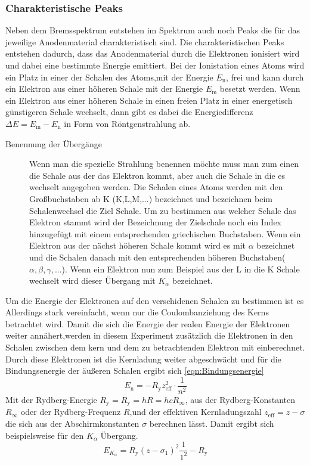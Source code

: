 \subsubsection{Charakteristische Peaks}
Neben dem Bremsspektrum entstehen im Spektrum auch noch Peaks die für das jeweilige Anodenmaterial charakteristisch sind.
Die charakteristischen Peaks entstehen dadurch, dass das Anodenmaterial durch die Elektronen ionisiert wird und dabei eine bestimmte Energie emittiert.
Bei der Ionistation eines Atoms wird ein Platz in einer der Schalen des Atoms,mit der Energie $E_{\text{n}}$, frei und kann durch ein Elektron aus einer höheren Schale mit der Energie $E_{\text{m}}$ besetzt werden.
Wenn ein Elektron aus einer höheren Schale in einen freien Platz in einer energetisch günstigeren Schale wechselt, dann gibt es dabei die Energiedifferenz $\Delta E = E_{\text{m}} -E_{\text{n}}$ in Form von Röntgenstrahlung ab.
\begin{description}
    \item[Benennung der Übergänge]
    Wenn man die spezielle Strahlung benennen möchte muss man zum einen die Schale aus der das Elektron kommt, aber auch die Schale in die es wechselt angegeben werden.
    Die Schalen eines Atoms werden mit den Großbuchstaben ab K (K,L,M,...) bezeichnet und bezeichnen beim Schalenwechsel die Ziel Schale.
    Um zu bestimmen aus welcher Schale das Elektron stammt wird der Bezeichnung der Zielschale noch ein Index hinzugefügt mit einem entsprechenden griechischen Buchstaben.
    Wenn ein Elektron aus der nächst höheren Schale kommt wird es mit $\alpha$ bezeichnet und die Schalen danach mit den entsprechenden höheren Buchstaben($\alpha,\beta,\gamma,...$).
    Wenn ein Elektron nun zum Beispiel aus der L in die K Schale wechselt wird dieser Übergang mit $K_{\alpha}$ bezeichnet.
\end{description}
Um die Energie der Elektronen auf den verschidenen Schalen zu bestimmen ist es Allerdings stark vereinfacht, wenn nur die Coulombanziehung des Kerns betrachtet wird.
Damit die sich die Energie der realen Energie der Elektronen weiter annähert,werden in diesem Experiment zusätzlich die Elektronen in den Schalen zwischen dem kern und dem zu betrachtenden Elektron mit einberechnet.
Durch diese Elektronen ist die Kernladung weiter abgeschwächt und für die Bindungsenergie der äußeren Schalen ergibt sich \ref{eqn:Bindungsenergie}
\begin{equation}
    E_{\text{n}} = -R_{\text{y}} z_{\text{eff}}^2 \cdot \frac{1}{n^2} \label{eqn:Bindungsenergie}
\end{equation}
Mit der Rydberg-Energie $R_{\text{y}} = R_{\text{y}} = hR = hcR_{\infty}$, aus der Rydberg-Konstanten $R_{\infty}$ oder der Rydberg-Frequenz $R$,und der effektiven Kernladungszahl $z_{\text{eff}} = z-\sigma$ die sich aus der Abschirmkonstanten $\sigma$ berechnen lässt.
Damit ergibt sich beispielsweise für den $K_{\alpha}$ Übergang.
\begin{equation*}
    E_{K_{\alpha}}= R_{\text{y}}(z-\sigma_1)^2 \frac{1}{1^2} - R_{\text{y}}
\end{equation*}

